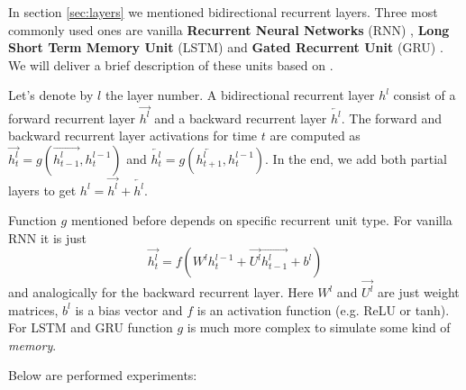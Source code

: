 \documentclass[licencjacka,en]{pracamgr}
\begin{document}
In section \ref{sec:layers} we mentioned bidirectional recurrent layers. Three most commonly used ones are vanilla \textbf{Recurrent Neural Networks} (RNN) \cite{RNN}, \textbf{Long Short Term Memory Unit} (LSTM) \cite{LSTM} and \textbf{Gated Recurrent Unit} (GRU) \cite{GRU}. We will deliver a brief description of these units based on \cite{DS2}.

Let's denote by $l$ the layer number. A bidirectional recurrent layer $h^l$ consist of a forward recurrent layer $\overrightarrow{h^l}$ and a backward recurrent layer $\overleftarrow{h^l}$. The forward and backward recurrent layer activations for time $t$ are computed as $\overrightarrow{h^l_t} = g(\overrightarrow{h^l_{t - 1}}, h^{l-1}_t)$ and $\overleftarrow{h^l_t} = g(\overleftarrow{h^l_{t+1}}, h^{l-1}_t)$. In the end, we add both partial layers to get $h^l = \overrightarrow{h^l} + \overleftarrow{h^l}$.

Function $g$ mentioned before depends on specific recurrent unit type. For vanilla RNN it is just
$$\overrightarrow{h^l_t} = f(W^l h^{l-1}_t + \overrightarrow{U^l} \overrightarrow{h^l_{t - 1}} + b^l)$$
and analogically for the backward recurrent layer. Here $W^l$ and $\overrightarrow{U^l}$ are just weight matrices, $b^l$ is a bias vector and $f$ is an activation function (e.g. ReLU or tanh). For LSTM and GRU function $g$ is much more complex to simulate some kind of \textit{memory}.

Below are performed experiments:

\noindent%
\begin{minipage}{\linewidth}%
		\label{fig:gru}		     
\end{minipage}
\end{document}
